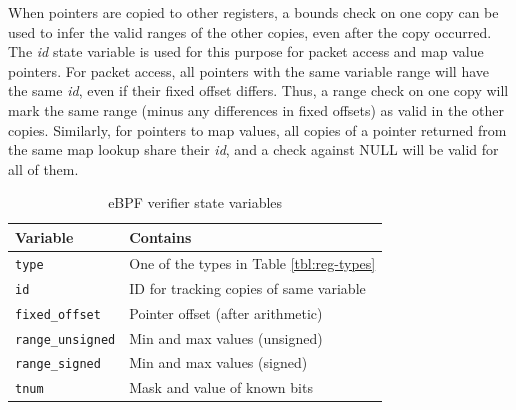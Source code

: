 \documentclass[10pt]{sig-alternate-05-2015}
\begin{document}
When pointers are copied to other registers, a bounds check on one copy can be
used to infer the valid ranges of the other copies, even after the copy
occurred. The \emph{id} state variable is used for this purpose for packet access and
map value pointers. For packet access, all pointers with the same variable
range will have the same \emph{id}, even if their fixed offset differs. Thus, a range
check on one copy will mark the same range (minus any differences in fixed
offsets) as valid in the other copies. Similarly, for pointers to map values,
all copies of a pointer returned from the same map lookup share their \emph{id}, and
a check against NULL will be valid for all of them.

\begin{table}[htbp]
\caption{\label{tbl:vrf-state-vars}
eBPF verifier state variables}
\centering
\begin{tabular}{ll}
\toprule
Variable & Contains\\
\midrule
\texttt{type} & One of the types in Table \ref{tbl:reg-types}\\
\texttt{id} & ID for tracking copies of same variable\\
\texttt{fixed\_offset} & Pointer offset (after arithmetic)\\
\texttt{range\_unsigned} & Min and max values (unsigned)\\
\texttt{range\_signed} & Min and max values (signed)\\
\texttt{tnum} & Mask and value of known bits\\
\bottomrule
\end{tabular}
\end{table}
\end{document}
